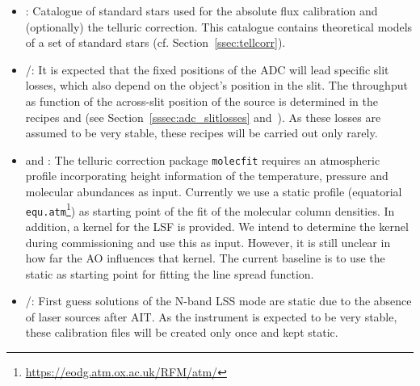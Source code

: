 \begin{itemize}
    \item {}: Catalogue of standard stars used for the absolute flux calibration and (optionally) the telluric correction. This catalogue contains theoretical models of a set of standard stars (cf. Section~\ref{ssec:tellcorr}).
    \item {}/: It is expected that the fixed positions of the \ac{ADC} will lead specific slit losses, which also depend on the object's position in the slit. The throughput as function of the across-slit position of the source is determined in the recipes  and  (see Section~\ref{sssec:adc_slitlosses} and~\cite{METIS-calibration_plan}). As these losses are assumed to be very stable, these recipes will be carried out only rarely.
    \item {} and : The telluric correction package \texttt{molecfit} requires an atmospheric profile incorporating height information of the temperature, pressure and molecular abundances as input. Currently we use a static profile (equatorial \texttt{equ.atm}\footnote{\url{https://eodg.atm.ox.ac.uk/RFM/atm/}}) as starting point of the fit of the molecular column densities. In addition, a kernel for the \ac{LSF} is provided. We intend to determine the kernel during commissioning and use this as input. However, it is still unclear in how far the \ac{AO} influences that kernel. The current baseline is to use the static  as starting point for fitting the line spread function.
    \item {}/: First guess solutions of the N-band LSS mode are static due to the absence of laser sources after \ac{AIT}. As the instrument is expected to be very stable, these calibration files will be created only once and kept static.
\end{itemize}
